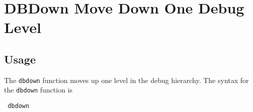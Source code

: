 \section{DBDown Move Down One Debug Level}

\subsection{Usage}

The \verb|dbdown| function moves up one level in the debug
hierarchy.  The syntax for the \verb|dbdown| function is
\begin{verbatim}
 dbdown
\end{verbatim}
